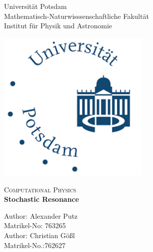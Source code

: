 \begin{titlepage}

\begin{center}



\begin{minipage}{0.57\textwidth}
\begin{flushleft}\large
\begin{center}
Universität Potsdam\\
Mathematisch-Naturwisssenschaftliche Fakultät\\
Institut für Physik und Astronomie\\
\end{center}
\end{flushleft}
\end{minipage}
\hfill
\begin{minipage}{0.42\textwidth}
\begin{flushright}
\begin{center}
\includegraphics[width=0.55\textwidth]{logo.png}\\ 
\end{center}
\end{flushright}
\end{minipage}
\vfill
\vspace*{0.5cm}
\textsc{\large Computational Physics}\\[0.5cm]


{ \Huge \bfseries Stochastic Resonance}\\[0.4cm]

\vspace*{2.5cm}

\begin{minipage}{0.45\textwidth}
\begin{flushleft} \normalsize 
Author: Alexander Putz\\ 
Matrikel-No: 763265\\
Author: Christian Gößl\\
Matrikel-No.:762627


\end{flushleft}
\end{minipage}
\end{center}
\end{titlepage}
